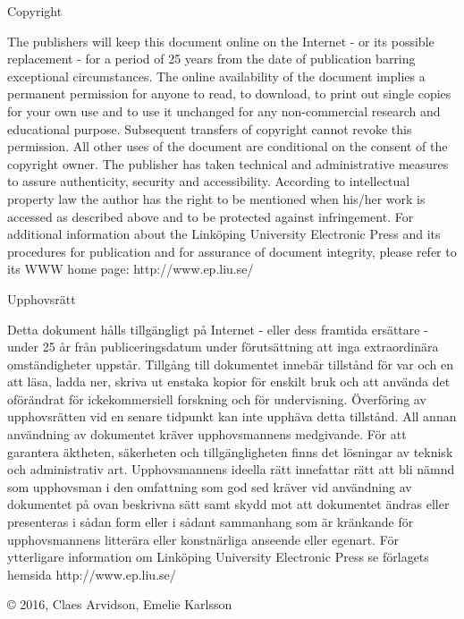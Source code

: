 \documentclass[a4paper, 10pt, twoside, openright]{book}
\newcommand{\putshortdate}[0]{2016}
\newcommand{\putauthor}[0]{Claes Arvidson, Emelie Karlsson}
\begin{document}
\null
\vspace{0cm} 

Copyright
\medskip

The publishers will keep this document online on the Internet - or its possible replacement - for a period of 25 years from the date of publication barring exceptional circumstances.
The online availability of the document implies a permanent permission for anyone to read, to download, to print out single copies for your own use and to use it unchanged for any non-commercial research and educational purpose. Subsequent transfers of copyright cannot revoke this permission. All other uses of the document are conditional on the consent of the copyright owner. The publisher has taken technical and administrative measures to assure authenticity, security and accessibility.
According to intellectual property law the author has the right to be mentioned when his/her work is accessed as described above and to be protected against infringement.
For additional information about the Linköping University Electronic Press and its procedures for publication and for assurance of document integrity, please refer to its WWW home page: http://www.ep.liu.se/
\bigskip

Upphovsr\"att
\medskip

Detta dokument hålls tillgängligt på Internet - eller dess framtida ersättare - under 25 år från publiceringsdatum under förutsättning att inga extraordi\-nära omständigheter uppstår.
Tillgång till dokumentet innebär tillstånd för var och en att läsa, ladda ner, skriva ut enstaka kopior för enskilt bruk och att använda det oförändrat för ickekommersiell forskning och för undervisning. Överföring av upphovsrätten vid en senare tidpunkt kan inte upphäva detta tillstånd. All annan användning av dokumentet kräver upphovsmannens medgivande. För att garantera äktheten, säkerheten och tillgängligheten finns det lösningar av teknisk och administrativ art.
Upphovsmannens ideella rätt innefattar rätt att bli nämnd som upphovsman i den omfattning som god sed kräver vid användning av dokumentet på ovan beskrivna sätt samt skydd mot att dokumentet ändras eller presenteras i sådan form eller i sådant sammanhang som är kränkande för upphovsmannens litterära eller konstnärliga anseende eller egenart.
För ytterligare information om Linköping University Electronic Press se förlagets hemsida http://www.ep.liu.se/

\medskip

\copyright\phantom{.} \putshortdate, \putauthor




\end{document}
